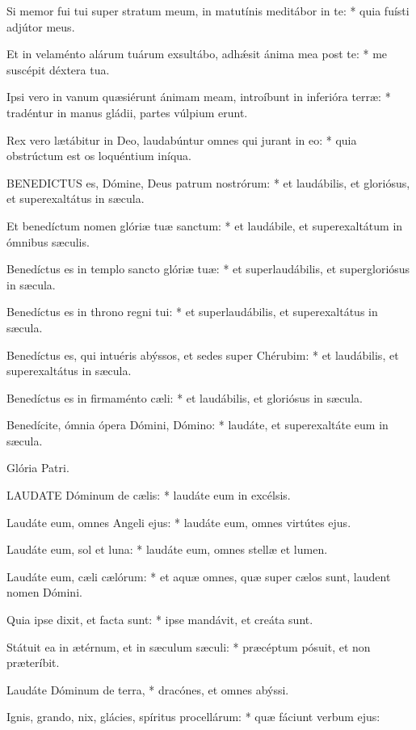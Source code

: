 Si memor fui tui super stratum meum, in matutínis meditábor in te: * quia fuísti adjútor meus.

Et in velaménto alárum tuárum exsultábo, adhǽsit ánima mea post te: * me suscépit déxtera tua.

Ipsi vero in vanum quæsiérunt ánimam meam, introíbunt in inferióra terræ: * tradéntur in manus gládii, partes vúlpium erunt.

Rex vero lætábitur in Deo, laudabúntur omnes qui jurant in eo: * quia obstrúctum est os loquéntium iníqua.


\lettrine[lines=2]{B}{ENEDICTUS} es, Dómine, Deus patrum nostrórum: * et laudábilis, et gloriósus, et superexaltátus in sæcula.

Et benedíctum nomen glóriæ tuæ sanctum: * et laudábile, et superexaltátum in ómnibus sæculis.

Benedíctus es in templo sancto glóriæ tuæ: * et superlaudábilis, et supergloriósus in sæcula.

Benedíctus es in throno regni tui: * et superlaudábilis, et superexaltátus in sæcula.

Benedíctus es, qui intuéris abýssos, et sedes super Chérubim: * et laudábilis, et superexaltátus in sæcula.

Benedíctus es in firmaménto cæli: * et laudábilis, et gloriósus in sæcula.

Benedícite, ómnia ópera Dómini, Dómino: * laudáte, et superexaltáte eum in sæcula.

Glória Patri.


\lettrine[lines=2]{L}{AUDATE} Dóminum de cælis: * laudáte eum in excélsis.

Laudáte eum, omnes Angeli ejus: * laudáte eum, omnes virtútes ejus.

Laudáte eum, sol et luna: * laudáte eum, omnes stellæ et lumen.

Laudáte eum, cæli cælórum: * et aquæ omnes, quæ super cælos sunt, laudent nomen Dómini.

Quia ipse dixit, et facta sunt: * ipse mandávit, et creáta sunt.

Státuit ea in ætérnum, et in sæculum sæculi: * præcéptum pósuit, et non præteríbit.

Laudáte Dóminum de terra, * dracónes, et omnes abýssi.

Ignis, grando, nix, glácies, spíritus procellárum: * quæ fáciunt verbum ejus:

